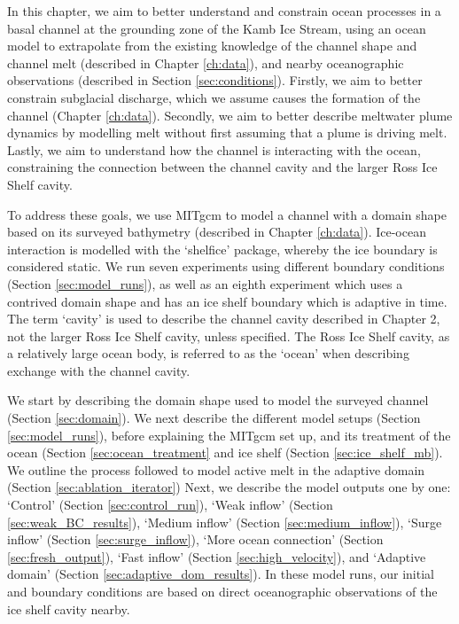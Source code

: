 In this chapter, we aim to better understand and constrain ocean processes in a basal channel at the grounding zone of the Kamb Ice Stream, using an ocean model to extrapolate from the existing knowledge of the channel shape and channel melt (described in Chapter \ref{ch:data}), and nearby oceanographic observations (described in Section \ref{sec:conditions}).  Firstly, we aim to better constrain subglacial discharge, which we assume causes the formation of the channel (Chapter \ref{ch:data}). Secondly, we aim to better describe meltwater plume dynamics by modelling melt without first assuming that a plume is driving melt. Lastly, we aim to understand how the channel is interacting with the  ocean, constraining the connection between the channel cavity and the larger Ross Ice Shelf cavity. 

To address these goals, we use MITgcm to model a channel with a domain shape based on its surveyed bathymetry (described in Chapter \ref{ch:data}). 
Ice-ocean interaction is modelled with the `shelfice' package, whereby the ice boundary is considered static. We run seven experiments using different boundary conditions (Section \ref{sec:model_runs}), as well as an eighth experiment which uses a contrived domain shape and has an ice shelf boundary which is adaptive in time. The term `cavity' is used to describe the channel cavity described in Chapter 2, not the larger Ross Ice Shelf cavity, unless specified.  The Ross Ice Shelf cavity, as a relatively large ocean body, is referred to as the `ocean' when describing exchange with the channel cavity. 

We start by describing the domain shape used to model the surveyed channel  (Section \ref{sec:domain}). We next describe the different model setups (Section \ref{sec:model_runs}), before explaining the MITgcm set up, and its treatment of the ocean (Section \ref{sec:ocean_treatment} and ice shelf (Section \ref{sec:ice_shelf_mb}). We outline the process followed to model active melt in the adaptive domain (Section  \ref{sec:ablation_iterator}) Next, we describe the model outputs one by one: `Control' (Section \ref{sec:control_run}), `Weak inflow' (Section \ref{sec:weak_BC_results}), `Medium inflow' (Section \ref{sec:medium_inflow}), `Surge inflow' (Section \ref{sec:surge_inflow}), `More ocean connection' (Section \ref{sec:fresh_output}), `Fast inflow' (Section \ref{sec:high_velocity}), and `Adaptive domain' (Section \ref{sec:adaptive_dom_results}). 
In these model runs, our initial and boundary conditions are based on direct oceanographic observations of the ice shelf cavity nearby.

